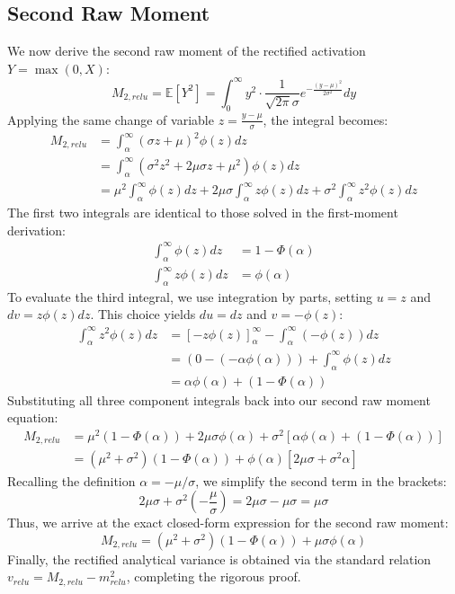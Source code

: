 \documentclass{article}
\theoremstyle{plain}
\theoremstyle{definition}
\theoremstyle{remark}
\begin{document}
\subsection{Second Raw Moment}
We now derive the second raw moment of the rectified activation $Y = \max(0, X)$:
\begin{equation}
    M_{2, relu} = \mathbb{E}[Y^2] = \int_{0}^{\infty} y^2 \cdot \frac{1}{\sqrt{2\pi}\sigma} e^{-\frac{(y-\mu)^2}{2\sigma^2}} dy
\end{equation}
Applying the same change of variable $z = \frac{y-\mu}{\sigma}$, the integral becomes:
\begin{align}
    M_{2, relu} &= \int_{\alpha}^{\infty} (\sigma z + \mu)^2 \phi(z) dz \nonumber \\
    &= \int_{\alpha}^{\infty} (\sigma^2 z^2 + 2\mu\sigma z + \mu^2) \phi(z) dz \nonumber \\
    &= \mu^2 \int_{\alpha}^{\infty} \phi(z) dz + 2\mu\sigma \int_{\alpha}^{\infty} z \phi(z) dz + \sigma^2 \int_{\alpha}^{\infty} z^2 \phi(z) dz
\end{align}
The first two integrals are identical to those solved in the first-moment derivation:
\begin{align}
    \int_{\alpha}^{\infty} \phi(z) dz &= 1 - \Phi(\alpha) \\
    \int_{\alpha}^{\infty} z \phi(z) dz &= \phi(\alpha)
\end{align}
To evaluate the third integral, we use integration by parts, setting $u = z$ and $dv = z \phi(z) dz$. This choice yields $du = dz$ and $v = -\phi(z)$:
\begin{align}
    \int_{\alpha}^{\infty} z^2 \phi(z) dz &= \left[ -z \phi(z) \right]_{\alpha}^{\infty} - \int_{\alpha}^{\infty} (-\phi(z)) dz \nonumber \\
    &= \left( 0 - (-\alpha \phi(\alpha)) \right) + \int_{\alpha}^{\infty} \phi(z) dz \nonumber \\
    &= \alpha \phi(\alpha) + (1 - \Phi(\alpha))
\end{align}
Substituting all three component integrals back into our second raw moment equation:
\begin{align}
    M_{2, relu} &= \mu^2 (1 - \Phi(\alpha)) + 2\mu\sigma \phi(\alpha) + \sigma^2 \left[ \alpha \phi(\alpha) + (1 - \Phi(\alpha)) \right] \nonumber \\
    &= (\mu^2 + \sigma^2)(1 - \Phi(\alpha)) + \phi(\alpha) \left[ 2\mu\sigma + \sigma^2 \alpha \right]
\end{align}
Recalling the definition $\alpha = -\mu/\sigma$, we simplify the second term in the brackets:
\begin{equation}
    2\mu\sigma + \sigma^2 \left(-\frac{\mu}{\sigma}\right) = 2\mu\sigma - \mu\sigma = \mu\sigma
\end{equation}
Thus, we arrive at the exact closed-form expression for the second raw moment:
\begin{equation}
    M_{2, relu} = (\mu^2 + \sigma^2)(1 - \Phi(\alpha)) + \mu \sigma \phi(\alpha)
\end{equation}
Finally, the rectified analytical variance is obtained via the standard relation $v_{relu} = M_{2, relu} - m_{relu}^2$, completing the rigorous proof.
\end{document}
